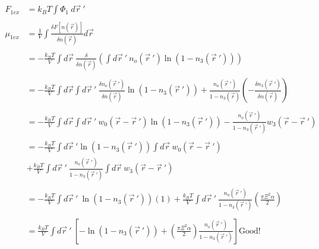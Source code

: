 \documentclass[double,12pt]{revtex4-2}
\begin{document}
\begin{align}
    F_{1ex} &= k_BT\int \Phi_1~d\vec r~' \\ \nonumber\\
    \mu_{1ex} &= \frac{1}{V}\int \frac{\delta F[n(\vec r)]}{\delta n(\vec r)} d\vec r \\ \nonumber\\
%
        &= -\frac{k_BT}{V} \int d\vec r ~\frac{\delta}
        {\delta n(\vec r)}\left(\int d\vec r~'~n_o(\vec r~')\ln(1-n_3(\vec r~'))\right) \\ \nonumber\\
%
        &= -\frac{k_BT}{V}\int d\vec r\int d\vec r~'~\frac{\delta n_o(\vec r~')}
        {\delta n(\vec r)}\ln(1-n_3(\vec r~'))+\frac{n_o(\vec r~')}
          {1-n_3(\vec r)}\left(-\frac{\delta n_3(\vec r~')}{\delta n(\vec r)}
          \right) \\ \nonumber\\
%
        &= -\frac{k_BT}{V} \int d\vec r \int d\vec r~' ~w_0(\vec r - \vec r~')
          \ln(1-n_3(\vec r~')) - \frac{n_o(\vec r~')}
          {1-n_3(\vec r~')}w_3(\vec r - \vec r~') \\ \nonumber\\
%
        &= -\frac{k_BT}{V} \int d\vec r~'\ln(1-n_3(\vec r~')) \int d \vec r  
          ~w_0(\vec r - \vec r~') \nonumber\\
        &+ \frac{k_BT}{V} \int d\vec r~' ~\frac{n_o(\vec r~')}{1-n_3(\vec r~')} 
          \int d \vec r~w_3(\vec r - \vec r~')  \\ \\
%
        &= -\frac{k_BT}{V} \int d\vec r~' ~\ln(1-n_3(\vec r~'))(1)
          + \frac{k_BT}{V} \int d\vec r~' ~\frac{n_o(\vec r~')}{1-n_3(\vec r~')}
          \left(\frac{\pi\Xi^2\alpha}{2}\right) \\ \\
%
        &= \frac{k_BT}{V}\int d\vec r~'~ \left[-\ln(1-n_3(\vec r~'))+\left(
        \frac{\pi\Xi^2\alpha}{2}\right)\frac{n_o(\vec r~')}{1-n_3(\vec r~')}\right]   \text{Good!}
\end{align}
\end{document}
